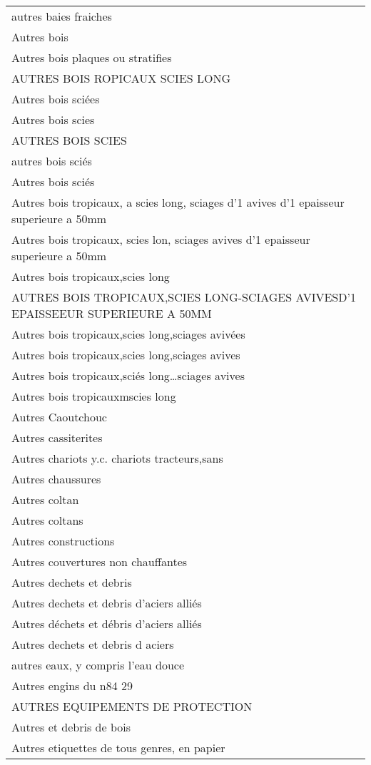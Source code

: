 \documentclass[
]{book}
\begin{document}
\begin{longtable}[t]{l}
autres baies fraiches\\
Autres bois\\
\addlinespace
Autres bois plaques ou stratifies\\
AUTRES BOIS ROPICAUX SCIES LONG\\
Autres bois sciées\\
Autres bois scies\\
AUTRES BOIS SCIES\\
\addlinespace
autres bois sciés\\
Autres bois sciés\\
Autres bois tropicaux, a scies long, sciages d'1 avives d'1 epaisseur superieure a 50mm\\
Autres bois tropicaux, scies lon, sciages avives d'1 epaisseur superieure a 50mm\\
Autres bois tropicaux,scies long\\
\addlinespace
AUTRES BOIS TROPICAUX,SCIES LONG-SCIAGES AVIVESD'1 EPAISSEEUR SUPERIEURE A 50MM\\
Autres bois tropicaux,scies long,sciages avivées\\
Autres bois tropicaux,scies long,sciages avives\\
Autres bois tropicaux,sciés long…sciages avives\\
Autres bois tropicauxmscies long\\
\addlinespace
Autres Caoutchouc\\
Autres cassiterites\\
Autres chariots y.c. chariots tracteurs,sans\\
Autres chaussures\\
Autres coltan\\
\addlinespace
Autres coltans\\
Autres constructions\\
Autres couvertures non chauffantes\\
Autres dechets et debris\\
Autres dechets et debris d'aciers alliés\\
\addlinespace
Autres déchets et débris d'aciers alliés\\
Autres dechets et debris d aciers\\
autres eaux, y compris l'eau douce\\
Autres engins du n84 29\\
AUTRES EQUIPEMENTS DE PROTECTION\\
\addlinespace
Autres et debris de bois\\
Autres etiquettes de tous genres, en papier\\

\end{longtable}
\end{document}
